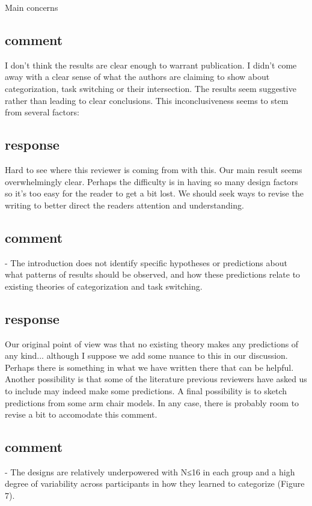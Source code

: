 Main concerns

\subsection{comment}
I don't think the results are clear enough to warrant
publication. I didn't come away with a clear sense of what
the authors are claiming to show about categorization, task
switching or their intersection. The results seem suggestive
rather than leading to clear conclusions. This
inconclusiveness seems to stem from several factors:

\subsection{response}
Hard to see where this reviewer is coming from with this.
Our main result seems overwhelmingly clear. Perhaps the
difficulty is in having so many design factors so it's too
easy for the reader to get a bit lost. We should seek ways
to revise the writing to better direct the readers attention
and understanding.

\subsection{comment}
- The introduction does not identify specific hypotheses or
predictions about what patterns of results should be
observed, and how these predictions relate to existing
theories of categorization and task switching.

\subsection{response}
Our original point of view was that no existing theory makes
any predictions of any kind... although I suppose we add
some nuance to this in our discussion. Perhaps there is
something in what we have written there that can be helpful.
Another possibility is that some of the literature previous
reviewers have asked us to include may indeed make some
predictions. A final possibility is to sketch predictions
from some arm chair models. In any case, there is probably
room to revise a bit to accomodate this comment.

\subsection{comment}
- The designs are relatively underpowered with N≤16 in each
group and a high degree of variability across participants
in how they learned to categorize (Figure 7).

